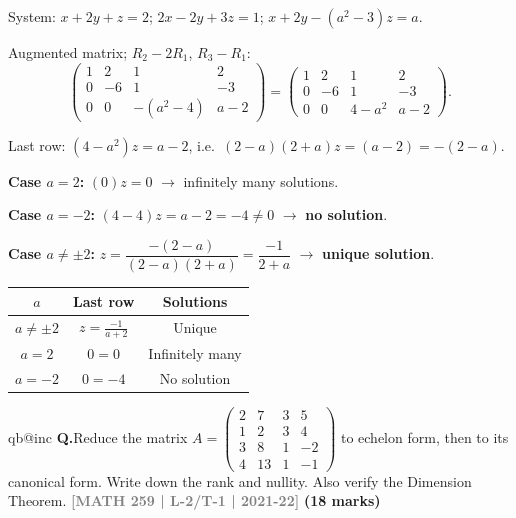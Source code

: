 \documentclass[12pt,a3paper]{article}
\makeatletter
\newcommand{\yr}[1]{\hfill\textcolor{gray}{\small\textbf{[#1]}}}
\newcommand{\mk}[1]{\textcolor{orange!70!black}{\small\textbf{(#1 marks)}}}
\newcounter{qnum}
\newcommand{\Q}[1]{%
  \csname qb@inc\endcsname
  \needspace{4\baselineskip}
  \refstepcounter{qnum}
  \vspace{6pt}
  \noindent\textbf{Q\theqnum.}\enspace #1\par
}
\makeatother
\begin{document}
\begin{tcolorbox}[enhanced,breakable,
  colback=cB!4,colframe=cB,boxrule=0.8pt,arc=5pt,
  title={\textbf{Answer --- Values of $a$: Solution Types for 3-Variable System}},
  fonttitle=\bfseries\color{white},colbacktitle=cB]

System: $x+2y+z=2$;\; $2x-2y+3z=1$;\; $x+2y-(a^2-3)z=a$.

Augmented matrix; $R_2-2R_1$, $R_3-R_1$:
\[
\begin{pmatrix}1&2&1&2\\0&-6&1&-3\\0&0&-(a^2-4)&a-2\end{pmatrix}
= \begin{pmatrix}1&2&1&2\\0&-6&1&-3\\0&0&4-a^2&a-2\end{pmatrix}.
\]

Last row: $(4-a^2)z=a-2$, i.e.\ $(2-a)(2+a)z=(a-2)=-(2-a)$.

\textbf{Case $a=2$:} $(0)z=0$ $\to$ infinitely many solutions.

\textbf{Case $a=-2$:} $(4-4)z=a-2=-4\neq0$ $\to$ \textbf{no solution}.

\textbf{Case $a\neq\pm2$:} $z=\dfrac{-(2-a)}{(2-a)(2+a)}=\dfrac{-1}{2+a}$ $\to$ \textbf{unique solution}.

\begin{center}
\small\begin{tabular}{@{}ccc@{}}
\toprule
$a$ & Last row & Solutions \\
\midrule
$a\neq\pm2$ & $z=\frac{-1}{a+2}$ & Unique \\
$a=2$ & $0=0$ & Infinitely many \\
$a=-2$ & $0=-4$ & No solution \\
\bottomrule
\end{tabular}
\end{center}

\end{tcolorbox}



\Q{Reduce the matrix $A = \begin{pmatrix} 2 & 7 & 3 & 5 \\ 1 & 2 & 3 & 4 \\ 3 & 8 & 1 & -2 \\ 4 & 13 & 1 & -1 \end{pmatrix}$ to echelon form, then to its canonical form. Write down the rank and nullity. Also verify the Dimension Theorem.
\yr{MATH 259 | L-2/T-1 | 2021-22} \mk{18}}
\end{document}
